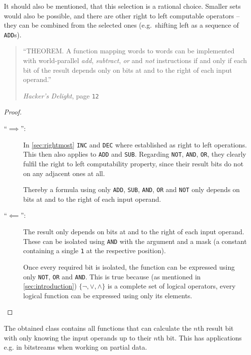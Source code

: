It should also be mentioned, that this selection is a rational choice.
Smaller sets would also be possible,
and there are other right to left computable operators
-- they can be combined from the selected ones
(e.g.~shifting left as a sequence of \lstinline$ADD$s).

\begin{quote}
``THEOREM. A function mapping words to words can be implemented
with world-parallel \emph{add}, \emph{subtract}, \emph{or} and \emph{not}
instructions if and only if each bit of the result
depends only on bits at and to the right of each input operand.''
\par\hfill \emph{Hacker's Delight},
page \texttt{12} \cite{Warren:2012:HD:2462741}
\end{quote}

\begin{proof}~
\begin{description}
\item[``$\implies$'':]
In \autoref{sec:rightmost} \lstinline$INC$ and \lstinline$DEC$
where established as right to left operations.
This then also applies to \lstinline$ADD$ and \lstinline$SUB$.
Regarding \lstinline$NOT$, \lstinline$AND$, \lstinline$OR$,
they clearly fulfil the right to left computability property,
since their result bits do not on any adjacent ones at all.

Thereby a formula using only
\lstinline$ADD$, \lstinline$SUB$, \lstinline$AND$,
\lstinline$OR$ and \lstinline$NOT$
only depends on bits at and to the right of each input operand.

\item[``$\impliedby$'':]
The result only depends on bits at and to the right of each input operand.
These can be isolated using \lstinline$AND$ with the argument and a mask
(a constant containing a single \lstinline$1$ at the respective position).

Once every required bit is isolated, the function can be expressed
using only \lstinline$NOT$, \lstinline$OR$ and \lstinline$AND$.
This is true because (as mentioned in \autoref{sec:introduction})
$\{\lnot, \lor, \land\}$ is a complete set of logical operators,
every logical function can be expressed using only its elements.
\end{description}
\end{proof}

The obtained class contains all functions
that can calculate the $n$th result bit
with only knowing the input operands up to their $n$th bit.
This has applications e.g. in bitstreams when working on partial data.
